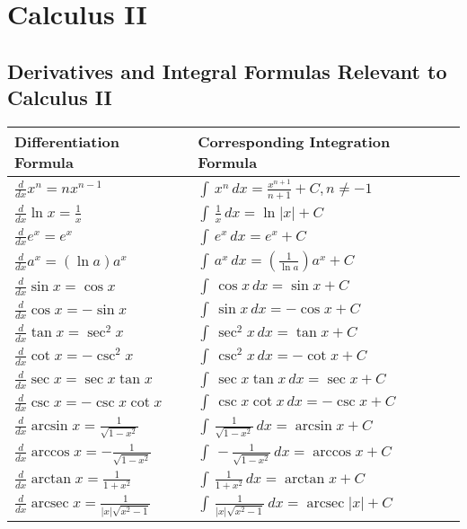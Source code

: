 \chapter{Calculus II}

\section{Derivatives and Integral Formulas Relevant to Calculus II}

\begin{table}[h]
  \centering
  \renewcommand{\arraystretch}{2}
  \begin{tabular}{p{5cm}p{7cm}}
  \toprule
  \textbf{Differentiation Formula} 
  & \textbf{Corresponding Integration Formula}\\ \hline
  $\frac{d}{dx}x^n = nx^{n-1}$ 
  & $\int \, x^n \, dx = \frac{x^{n+1}}{n+1} + C, n \neq -1$ \\ 
  \hline
  $\frac{d}{dx} \ln x = \frac{1}{x}$ 
  & $\int \, \frac{1}{x} \, dx = \ln |x| + C$\\
  \hline
  $\frac{d}{dx} e^x = e^x$ & $\int \, e^x \, dx = e^x + C$\\
  \hline
  $\frac{d}{dx} a^x = (\ln a)a^x$ 
  & $\int \, a^x \, dx = \left(\frac{1}{\ln a}\right)a^x + C$\\
  \hline
  $\frac{d}{dx} \sin x = \cos x$ & $\int \, \cos x \, dx = \sin x + C$\\
  \hline
  $\frac{d}{dx} \cos x = -\sin x$ & $\int \, \sin x \, dx = -\cos x + C$\\
  \hline
  $\frac{d}{dx} \tan x = \sec^2 x$ & $\int \, \sec^2x \, dx = \tan x + C$\\
  \hline
  $\frac{d}{dx} \cot x = -\csc^2 x$ & $\int \, \csc^2x \, dx = -\cot x + C$\\
  \hline
  $\frac{d}{dx} \sec x = \sec x \tan x$ 
  & $\int \, \sec x \tan x \, dx = \sec x + C$\\
  \hline
  $\frac{d}{dx} \csc x = -\csc x \cot x$ 
  & $\int \, \csc x \cot x \, dx = -\csc x + C$\\
  \hline
  $\frac{d}{dx} \arcsin x = \frac{1}{\sqrt{1-x^2}}$ 
  & $\int \, \frac{1}{\sqrt{1-x^2}} \, dx = \arcsin x + C$\\
  \hline
  $\frac{d}{dx} \arccos x = -\frac{1}{\sqrt{1-x^2}}$ 
  & $\int \, -\frac{1}{\sqrt{1-x^2}} \, dx = \arccos x + C$\\
  \hline
  $\frac{d}{dx} \arctan x = \frac{1}{1+x^2}$ 
  & $\int \, \frac{1}{1+x^2} \, dx = \arctan x + C$\\
  \hline
  $\frac{d}{dx} \operatorname{arcsec} x = \frac{1}{|x|\sqrt{x^2-1}}$ 
  & $\int \, \frac{1}{|x|\sqrt{x^2-1}} \, 
  dx = \operatorname{arcsec} |x| + C$\\ \bottomrule
  \end{tabular}
  \end{table}


